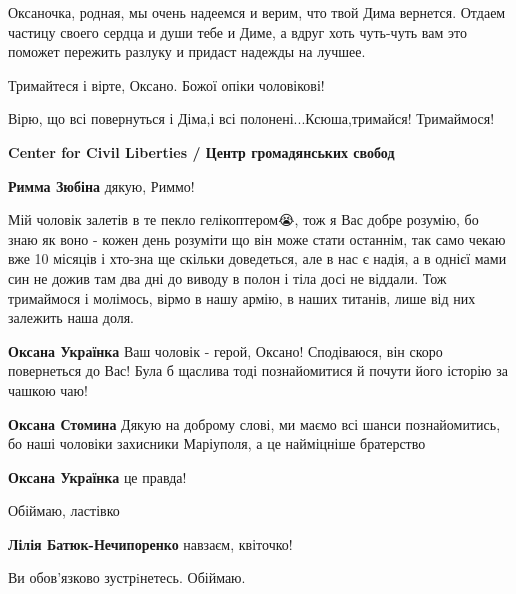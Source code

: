 Оксаночка, родная, мы очень надеемся и верим, что твой Дима вернется. Отдаем
частицу своего сердца и души тебе и Диме, а вдруг хоть чуть-чуть вам это
поможет пережить разлуку и придаст надежды на лучшее.


Тримайтеся і вірте, Оксано. Божої опіки чоловікові!


Вірю, що всі повернуться і Діма,і всі полонені...Ксюша,тримайся! Тримаймося!


\textbf{Center for Civil Liberties / Центр громадянських свобод}

\begin{itemize} %
\textbf{Римма Зюбіна} дякую, Риммо!
\end{itemize} %


Мій чоловік залетів в те пекло гелікоптером😭, тож я Вас добре розумію, бо знаю
як воно - кожен день розуміти що він може стати останнім, так само чекаю вже 10
місяців і хто-зна ще скільки доведеться, але в нас є надія, а в однієї мами син
не дожив там два дні до виводу в полон і тіла досі не віддали. Тож тримаймося і
молімось, вірмо в нашу армію, в наших титанів, лише від них залежить наша доля.

\begin{itemize} %
\textbf{Оксана Українка} Ваш чоловік - герой, Оксано! Сподіваюся, він скоро повернеться до Вас! Була б щаслива тоді познайомитися й почути його історію за чашкою чаю!

\textbf{Оксана Стомина} Дякую на доброму слові, ми маємо всі шанси познайомитись, бо наші чоловіки захисники Маріуполя, а це найміцніше братерство

\textbf{Оксана Українка} це правда!
\end{itemize} %


Обіймаю, ластівко

\begin{itemize} %
\textbf{Лілія Батюк-Нечипоренко} навзаєм, квіточко!

\end{itemize} %


Ви обов'язково зустрiнетесь. Обіймаю.

